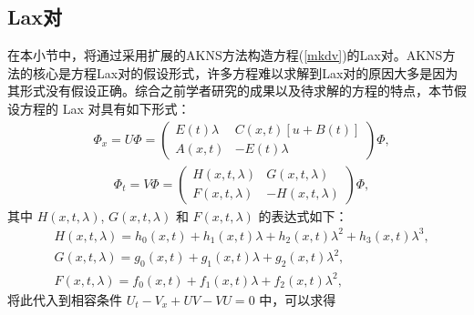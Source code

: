 \subsection{Lax对}
在本小节中，将通过采用扩展的AKNS方法构造方程(\ref{mkdv})的Lax对。AKNS方法的核心是方程Lax对的假设形式，许多方程难以求解到Lax对的原因大多是因为其形式没有假设正确。综合之前学者研究的成果以及待求解的方程的特点，本节假设方程的 Lax 对具有如下形式：
\begin{align}
&\Phi_x=U \Phi=
\begin{pmatrix}
E(t)\lambda & C(x,t)[u+B(t)]\\
A(x,t) & -E(t)\lambda
\end{pmatrix}\Phi,\label{mkdv-lp1}
\end{align}
\begin{align}
&\Phi_t=V \Phi=
\begin{pmatrix}
H(x,t,\lambda) & G(x,t,\lambda)\\
F(x,t,\lambda) & -H(x,t,\lambda)
\end{pmatrix}\Phi,\label{mkdv-lp2}
\end{align}
其中 $H(x,t,\lambda)$,
$G(x,t,\lambda)$ 和 $F(x,t,\lambda)$ 的表达式如下：
\begin{align}
&H(x,t,\lambda )=h_0(x,t)+h_1(x,t)\lambda  + h_2(x,t)\lambda^2
+ h_3(x,t)\lambda^3 ,\\
&G(x,t,\lambda )=g_0(x,t)+g_1(x,t)\lambda  + g_2(x,t)\lambda^2 ,\\
&F(x,t,\lambda )=f_0(x,t)+f_1(x,t)\lambda  + f_2(x,t)\lambda^2,
\end{align}
将此代入到相容条件 $U_t - V_x + U V - V U = 0$ 中，可以求得
